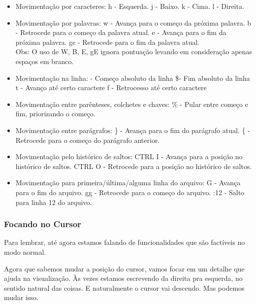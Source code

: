 \documentclass[a4paper, 12pt]{article}
\begin{document}
\begin{itemize}
    \item Movimentação por caracteres:
        \subitem h - Esquerda.
        \subitem j - Baixo.
        \subitem k - Cima.
        \subitem l - Direita.
    \item Movimentação por palavras:
        \subitem w  - Avança para o começo da próxima palavra.
        \subitem b  - Retrocede para o começo da palavra atual.
        \subitem e  - Avança para o fim da próxima palavra.
        \subitem ge - Retrocede para o fim da palavra atual.\\
        Obs: O uso de W, B, E, gE ignora pontuação levando em consideração apenas espaços em branco.
    \item Movimentação na linha:
         - Começo absoluto da linha
        \subitem \$- Fim absoluto da linha
        \subitem t - Avanço até certo caractere
        \subitem f - Retrocesso até certo caractere
    \item Movimentação entre parênteses, colchetes e chaves:
        \subitem \% - Pular entre começo e fim, priorizando o começo.
    \item Movimentação entre parágrafos:
        \subitem \} - Avança para o fim do parágrafo atual.
        \subitem \{ - Retrocede para o começo do parágrafo anterior.
    \item Movimentação pelo histórico de saltos:
        \subitem CTRL I - Avança para a posição no histórico de saltos.
        \subitem CTRL O - Retrocede para a posição no histórico de saltos.
    \item Movimentação para primeira/última/alguma linha do arquivo:
        \subitem G - Avança para o fim do arquivo.
        \subitem gg - Retrocede para o começo do arquivo.
        \subitem :12 - Salto para linha 12 do arquivo.
\end{itemize}
    
\subsubsection{Focando no Cursor}
Para lembrar, até agora estamos falando de funcionalidades que são factíveis no modo normal.

Agora que sabemos mudar a posição do cursor, vamos focar em um detalhe que ajuda na visualização.
Às vezes estamos escrevendo da direita pra esquerda, no sentido natural das coisas.
E naturalmente o cursor vai descendo.
Mas podemos mudar isso.
\end{document}

